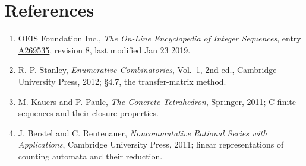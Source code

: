 \documentclass[11pt]{article}
\theoremstyle{definition}
\begin{document}
\section{References}

\begin{enumerate}

\item OEIS Foundation Inc., \emph{The On-Line Encyclopedia of Integer Sequences}, entry \href{https://oeis.org/A269535}{A269535}, revision 8, last modified Jan 23 2019.

\item R. P. Stanley, \emph{Enumerative Combinatorics}, Vol.~1, 2nd ed., Cambridge University Press, 2012; \S4.7, the transfer-matrix method.

\item M. Kauers and P. Paule, \emph{The Concrete Tetrahedron}, Springer, 2011; C-finite sequences and their closure properties.

\item J. Berstel and C. Reutenauer, \emph{Noncommutative Rational Series with Applications}, Cambridge University Press, 2011; linear representations of counting automata and their reduction.

\end{enumerate}
\end{document}
